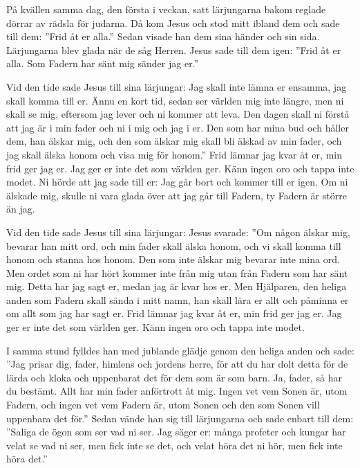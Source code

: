 
På kvällen samma dag, den första i veckan, satt lärjungarna bakom reglade dörrar av rädsla för judarna. Då kom Jesus och stod mitt ibland dem och sade till dem: ”Frid åt er alla.” 
Sedan visade han dem sina händer och sin sida. Lärjungarna blev glada när de såg Herren. 
Jesus sade till dem igen: ”Frid åt er alla. Som Fadern har sänt mig sänder jag er.” 



Vid den tide sade Jesus till sina lärjungar: Jag skall inte lämna er ensamma, jag skall komma till er. 
Ännu en kort tid, sedan ser världen mig inte längre, men ni skall se mig, eftersom jag lever och ni kommer att leva. 
Den dagen skall ni förstå att jag är i min fader och ni i mig och jag i er. 
Den som har mina bud och håller dem, han älskar mig, och den som älskar mig skall bli älskad av min fader, och jag skall älska honom och visa mig för honom.” 
Frid lämnar jag kvar åt er, min frid ger jag er. Jag ger er inte det som världen ger. Känn ingen oro och tappa inte modet. 
Ni hörde att jag sade till er: Jag går bort och kommer till er igen. Om ni älskade mig, skulle ni vara glada över att jag går till Fadern, ty Fadern är större än jag. 



Vid den tide sade Jesus till sina lärjungar: Jesus svarade: ”Om någon älskar mig, bevarar han mitt ord, och min fader skall älska honom, och vi skall komma till honom och stanna hos honom. 
Den som inte älskar mig bevarar inte mina ord. Men ordet som ni har hört kommer inte från mig utan från Fadern som har sänt mig.
Detta har jag sagt er, medan jag är kvar hos er. 
Men Hjälparen, den heliga anden som Fadern skall sända i mitt namn, han skall lära er allt och påminna er om allt som jag har sagt er. 
Frid lämnar jag kvar åt er, min frid ger jag er. Jag ger er inte det som världen ger. Känn ingen oro och tappa inte modet.



I samma stund fylldes han med jublande glädje genom den heliga anden och sade: ”Jag prisar dig, fader, himlens och jordens herre, för att du har dolt detta för de lärda och kloka och uppenbarat det för dem som är som barn. Ja, fader, så har du bestämt. 
Allt har min fader anförtrott åt mig. Ingen vet vem Sonen är, utom Fadern, och ingen vet vem Fadern är, utom Sonen och den som Sonen vill uppenbara det för.” 
Sedan vände han sig till lärjungarna och sade enbart till dem: ”Saliga de ögon som ser vad ni ser. 
Jag säger er: många profeter och kungar har velat se vad ni ser, men fick inte se det, och velat höra det ni hör, men fick inte höra det.”


